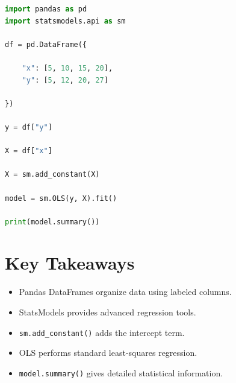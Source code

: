 \documentclass[11pt]{article}
\begin{document}
\begin{lstlisting}[language=Python]
import pandas as pd
import statsmodels.api as sm

df = pd.DataFrame({

    "x": [5, 10, 15, 20],
    "y": [5, 12, 20, 27]

})

y = df["y"]

X = df["x"]

X = sm.add_constant(X)

model = sm.OLS(y, X).fit()

print(model.summary())
\end{lstlisting}

\section{Key Takeaways}

\begin{itemize}
    \item Pandas DataFrames organize data using labeled columns.
    \item StatsModels provides advanced regression tools.
    \item \texttt{sm.add\_constant()} adds the intercept term.
    \item OLS performs standard least-squares regression.
    \item \texttt{model.summary()} gives detailed statistical information.
\end{itemize}
\end{document}
